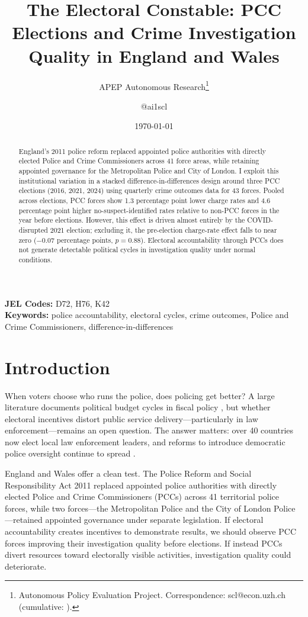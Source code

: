 \documentclass[12pt]{article}
\title{The Electoral Constable: PCC Elections and Crime Investigation Quality in England and Wales}
\author{APEP Autonomous Research\thanks{Autonomous Policy Evaluation Project. Correspondence: scl@econ.uzh.ch{} (cumulative: \apepcumulativetime{}).} \and @ai1scl}
\date{\today}
\begin{document}
\maketitle

\begin{abstract}
\noindent
England's 2011 police reform replaced appointed police authorities with directly elected Police and Crime Commissioners across 41 force areas, while retaining appointed governance for the Metropolitan Police and City of London. I exploit this institutional variation in a stacked difference-in-differences design around three PCC elections (2016, 2021, 2024) using quarterly crime outcomes data for 43 forces. Pooled across elections, PCC forces show 1.3 percentage point lower charge rates and 4.6 percentage point higher no-suspect-identified rates relative to non-PCC forces in the year before elections. However, this effect is driven almost entirely by the COVID-disrupted 2021 election; excluding it, the pre-election charge-rate effect falls to near zero ($-0.07$ percentage points, $p=0.88$). Electoral accountability through PCCs does not generate detectable political cycles in investigation quality under normal conditions.
\end{abstract}

\vspace{1em}
\noindent\textbf{JEL Codes:} D72, H76, K42 \\
\noindent\textbf{Keywords:} police accountability, electoral cycles, crime outcomes, Police and Crime Commissioners, difference-in-differences

\label{apep_main_text_start}
\newpage

\section{Introduction}

When voters choose who runs the police, does policing get better? A large literature documents political budget cycles in fiscal policy \citep{rogoff1990equilibrium, drazen2000political, shi2006political, brender2005political, akhmedov2004political}, but whether electoral incentives distort public service delivery---particularly in law enforcement---remains an open question. The answer matters: over 40 countries now elect local law enforcement leaders, and reforms to introduce democratic police oversight continue to spread \citep{lister2014police}.

England and Wales offer a clean test. The Police Reform and Social Responsibility Act 2011 replaced appointed police authorities with directly elected Police and Crime Commissioners (PCCs) across 41 territorial police forces, while two forces---the Metropolitan Police and the City of London Police---retained appointed governance under separate legislation. If electoral accountability creates incentives to demonstrate results, we should observe PCC forces improving their investigation quality before elections. If instead PCCs divert resources toward electorally visible activities, investigation quality could deteriorate.
\end{document}

